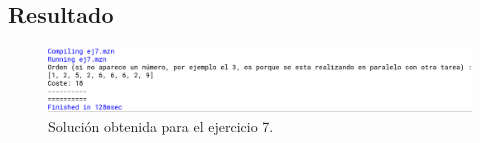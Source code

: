 \documentclass[11pt, spanish]{article}
\begin{document}
\subsection{Resultado}


\begin{figure}[H]
  \centering
      \includegraphics[scale = 0.30]{sol7.png}
 		 \caption{Solución obtenida para el ejercicio 7.}
  		\label{fig:ej7}

\end{figure}










\end{document}
